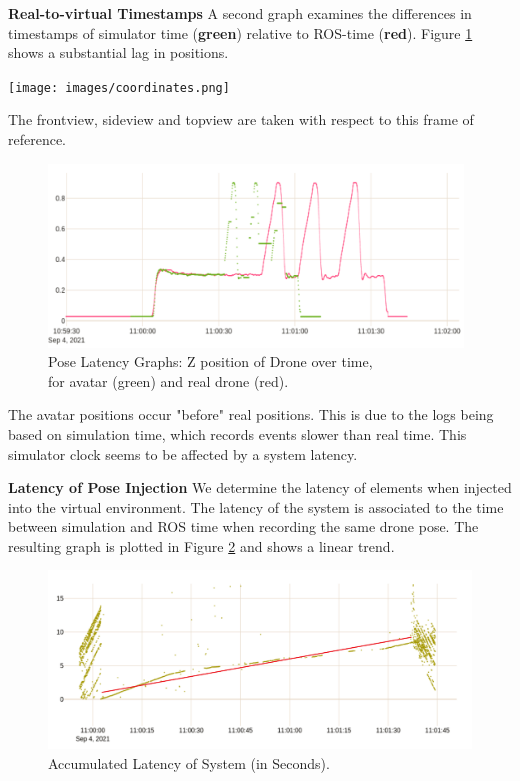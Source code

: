 \textbf{Real-to-virtual Timestamps  } A second graph examines the differences in timestamps of simulator time (\textbf{green}) relative to ROS-time (\textbf{red}). Figure \ref{fig:pos_time} shows a substantial lag in positions.

\begin{marginfigure}%
  \vspace{1cm}
  \hspace{0.5cm}
  \texttt{[image: images/coordinates.png]}
   \caption{The frontview, sideview and topview are taken with respect to this frame of reference.}
  \label{fig:refframe}
\end{marginfigure}

\begin{figure}[!h]
    \raggedright
    \includegraphics[width=11cm]{images/hdi_graphs/time_delay_inv.png}
    \caption{Pose Latency Graphs: Z position of Drone over time, \\for avatar (green) and real drone (red).}
    \label{fig:pos_time}
\end{figure}

The avatar positions occur "before" real positions. This is due to the logs being based on simulation time, which records events slower than real time. This simulator clock seems to be affected by a system latency.

\textbf{Latency of Pose Injection       } We determine the latency of elements when injected into the virtual environment. The latency of the system is associated to the time between simulation and ROS time when recording the same drone pose. The resulting graph is plotted in Figure \ref{fig:xr_poses} and shows a linear trend.

\begin{figure}[!h]
    \raggedright
    \includegraphics[width=11.5cm]{images/xr_graphs/latency_plot_inv2_fakeregression.png}
    \caption{Accumulated Latency of System (in Seconds).}
    \label{fig:xr_poses}
\end{figure}

